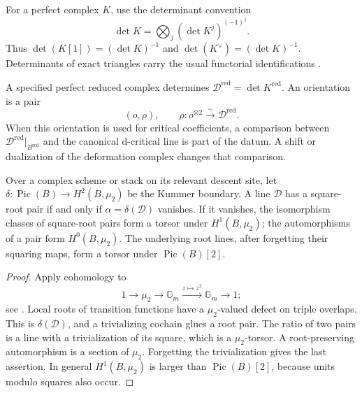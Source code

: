 For a perfect complex \(K\), use the determinant convention
\[
 \det K=\bigotimes_j(\det K^j)^{(-1)^j}.
\]
Thus \(\det(K[1])=(\det K)^{-1}\) and
\(\det(K^\vee)=(\det K)^{-1}\).  Determinants of exact triangles carry
the usual functorial identifications
\cite{KnudsenMumfordDet,DeligneDetCohomology}.

\begin{definition}
\label{def:rhomred-determinant-line}
A specified perfect reduced complex determines
\(\mathscr D^{\mathrm{red}}=\det K^{\mathrm{red}}\).
An orientation is a pair
\[
 (o,\rho),\qquad \rho:o^{\otimes2}\xrightarrow{\sim}
 \mathscr D^{\mathrm{red}}.
\]
When this orientation is used for critical coefficients, a comparison
between \(\mathscr D^{\mathrm{red}}|_{B^{\mathrm{red}}}\) and the
canonical d-critical line is part of the datum.  A shift or dualization
of the deformation complex changes that comparison.
\end{definition}

\begin{proposition}
\label{prop:rhomred-square-root-criterion}
\label{prop:alpha-red-vanishing-criterion}
\label{prop:alpha-red-nullhomotopy-criterion}
Over a complex scheme or stack on its relevant descent site, let
\(\delta:\operatorname{Pic}(B)\to H^2(B,\mu_2)\) be the Kummer
boundary.  A line \(\mathscr D\) has a square-root pair if and only if
\(\alpha=\delta(\mathscr D)\) vanishes.  If it vanishes, the
isomorphism classes of square-root pairs form a torsor under
\(H^1(B,\mu_2)\); the automorphisms of a pair form \(H^0(B,\mu_2)\).
The underlying root lines, after forgetting their squaring maps, form
a torsor under \(\operatorname{Pic}(B)[2]\).
\end{proposition}
\begin{proof}
Apply cohomology to
\[
 1\longrightarrow\mu_2\longrightarrow\mathbb G_m
 \xrightarrow{z\mapsto z^2}\mathbb G_m\longrightarrow1;
\]
see \cite[Tags 03PK, 03PL]{StacksProject}.  Local roots of transition
functions have a \(\mu_2\)-valued defect on triple overlaps.  This is
\(\delta(\mathscr D)\), and a trivializing cochain glues a root pair.
The ratio of two pairs is a line with a trivialization of its square,
which is a \(\mu_2\)-torsor.  A root-preserving automorphism is a
section of \(\mu_2\).  Forgetting the trivialization gives the last
assertion.  In general \(H^1(B,\mu_2)\) is larger than
\(\operatorname{Pic}(B)[2]\), because units modulo squares also occur.
\end{proof}

